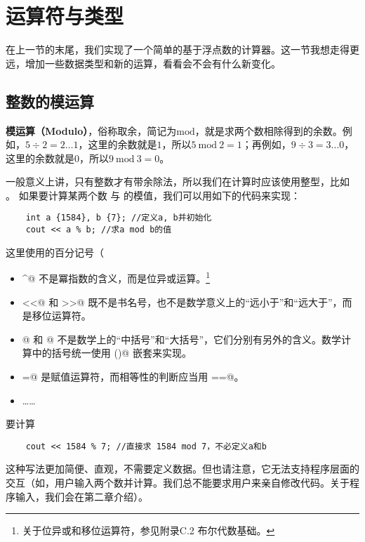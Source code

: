 \section{运算符与类型}
在上一节的末尾，我们实现了一个简单的基于浮点数的计算器。这一节我想走得更远，增加一些数据类型和新的运算，看看会不会有什么新变化。\par
\subsection*{整数的模运算}
\textbf{模运算（Modulo）}，俗称取余，简记为$\mathrm{mod}$，就是求两个数相除得到的余数。例如，$5\div2=2\ldots1$，这里的余数就是$1$，所以$5\:\mathrm{mod}\:2=1$；再例如，$9\div3=3\ldots0$，这里的余数就是$0$，所以$9\:\mathrm{mod}\:3=0$。\par
一般意义上讲，只有整数才有带余除法，所以我们在计算时应该使用整型，比如 \lstinline@int@。
如果要计算某两个数 \lstinline@a@ 与 \lstinline@b@ 的模值，我们可以用如下的代码来实现： 
\begin{lstlisting}
    int a {1584}, b {7}; //定义a, b并初始化
    cout << a % b; //求a mod b的值
\end{lstlisting}
这里使用的百分记号（\lstinline@%@）可能会让人费解。其实在C++中，\lstinline@%@ 并不是百分记号，而是取模运算符，含义是左边整数除以右边整数得到的余数（模值）。在各类编程语言中，这种``记号含义与数学含义不同''的现象比比皆是。以下是C++当中的部分例子（读者无需现在就掌握，但日后要留心）：
\begin{itemize}
    \item \lstinline@^@ 不是冪指数的含义，而是位异或运算。\footnote{关于位异或和移位运算符，参见附录C.2 布尔代数基础。}%
    \item \lstinline@<<@ 和 \lstinline@>>@ 既不是书名号，也不是数学意义上的``远小于''和``远大于''，而是移位运算符。
    \item \lstinline@[]@ 和 \lstinline@{}@ 不是数学上的``中括号''和``大括号''，它们分别有另外的含义。数学计算中的括号统一使用 \lstinline@()@ 嵌套来实现。
    \item \lstinline@=@ 是赋值运算符，而相等性的判断应当用 \lstinline@==@。
    \item \dots\dots
\end{itemize}\par
要计算 %
\begin{lstlisting}
    cout << 1584 % 7; //直接求 1584 mod 7，不必定义a和b
\end{lstlisting}
这种写法更加简便、直观，不需要定义数据。但也请注意，它无法支持程序层面的交互（如，用户输入两个数并计算。我们总不能要求用户来亲自修改代码。关于程序输入，我们会在第二章介绍）。\par
